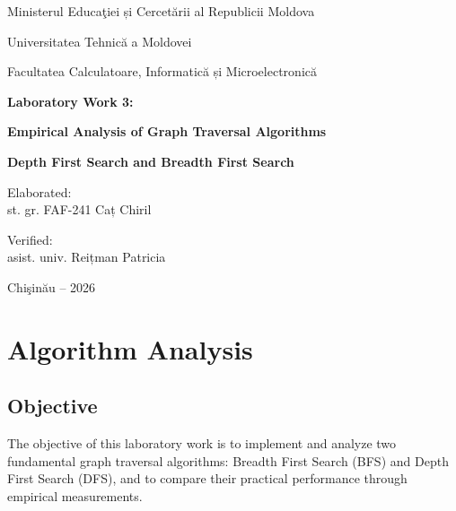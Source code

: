 \documentclass[12pt]{article}
\begin{document}
\begin{titlepage}
    \centering

    {\large Ministerul Educaţiei și Cercetării al Republicii Moldova\par}
    \vspace{0.5cm}
    {\large Universitatea Tehnică a Moldovei\par}
    \vspace{0.5cm}
    {\large Facultatea Calculatoare, Informatică și Microelectronică\par}

    \vspace{3cm}

    {\Large \textbf{Laboratory Work 3:}\par}
    \vspace{0.5cm}
    {\Large \textbf{Empirical Analysis of Graph Traversal Algorithms}\par}
    \vspace{0.3cm}
    {\Large \textbf{Depth First Search and Breadth First Search}\par}

    \vspace{8cm}

    \begin{flushleft}
        Elaborated:\\
        st. gr. FAF-241 Caț Chiril

        \vspace{1cm}

        Verified:\\
        asist. univ. Reițman Patricia
    \end{flushleft}

    \vfill

    Chişinău -- 2026

\end{titlepage}

\tableofcontents
\newpage

\section{Algorithm Analysis}

\subsection{Objective}

The objective of this laboratory work is to implement and analyze two fundamental graph traversal algorithms: Breadth First Search (BFS) and Depth First Search (DFS), and to compare their practical performance through empirical measurements.
\end{document}
